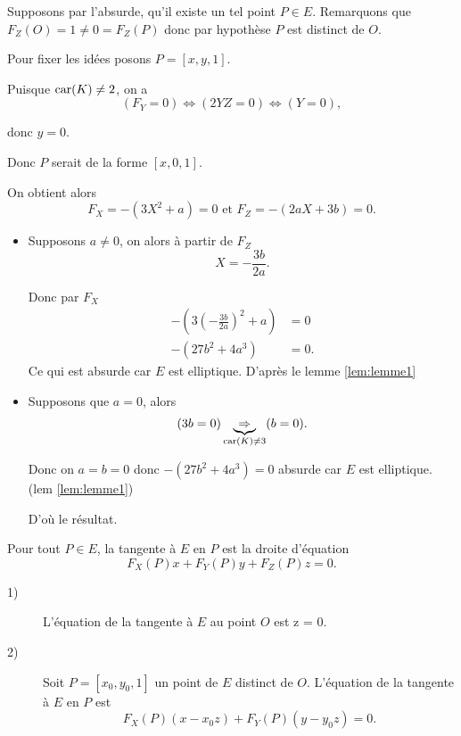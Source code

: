 \begin{demonstration}
   Supposons par l'absurde, qu'il existe un tel point $P \in E$. Remarquons que $F_{Z}(O) = 1 \neq 0 = F_{Z}(P)$ donc par hypothèse $P$ est distinct de $O$.

   Pour fixer les idées posons $P = [x,y,1]$.

   Puisque $\operatorname{car}(K) \neq 2$, on a
   \[
       (F_{Y} = 0) \iff (2YZ = 0) \iff (Y = 0) 
   ,\] 

   donc $y = 0$.
   
   Donc $P$ serait de la forme $[x,0,1]$.
   
   On obtient alors
   \[
   F_{X} = - \left( 3X^2 + a \right) = 0 \text{ et } F_{Z} = -\left( 2aX + 3b \right) = 0
   .\] 
   
   \begin{itemize}
       \item Supposons $a \neq 0$, on alors à partir de $F_{Z}$
   \[
       X = - \frac{3b}{2a} 
   .\] 

   Donc par $F_{X}$
\begin{align*}
    - \left( 3 (- \frac{3b}{2a})^2 + a \right) &= 0 \\
    - \left( 27b^2 + 4a^3 \right) &= 0
.\end{align*}
Ce qui est absurde car $E$ est elliptique. D'après le lemme \ref{lem:lemme1}
        \item Supposons que $a = 0$, alors
            \[
                (3b = 0) \underbrace{\Rightarrow}_{\operatorname{car}(K) \neq 3} (b = 0)
            .\] 

            Donc on $a = b = 0$ donc $-\left( 27b^2 + 4a^3 \right) = 0$ absurde car $E$ est elliptique. (lem \ref{lem:lemme1})

            D'où le résultat.
   \end{itemize}
\end{demonstration}

\begin{definition}
    Pour tout $P \in E$, la tangente à $E$ en $P$ est la droite d'équation
    \[
    F_{X}(P)x+F_{Y}(P)y+F_{Z}(P)z=0
    .\] 
\end{definition}

\begin{lemme}
    \label{lem:lemme4}
    
    \begin{description}
        \item[1)] L'équation de la tangente à $E$ au point $O$ est z = 0.
        \item[2)] Soit $P = \left[ x_0, y_0, 1 \right]$ un point de $E$ distinct de $O$. L'équation de la tangente à $E$ en $P$ est
            \[
            F_{X}(P)\left( x - x_0z \right) + F_{Y}(P)\left( y - y_0z \right) = 0
            .\] 
    \end{description}
\end{lemme}

